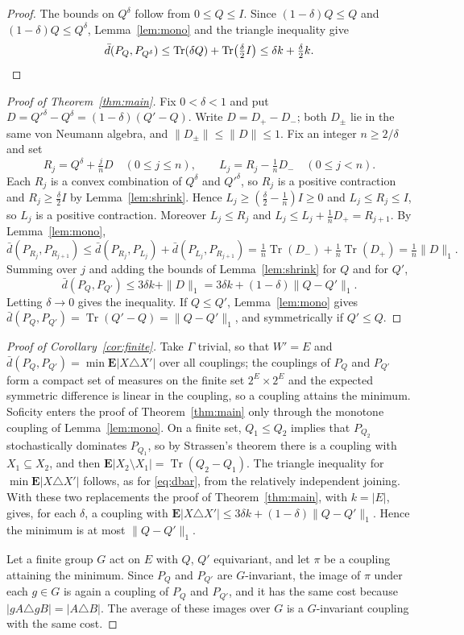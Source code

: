 \documentclass[11pt]{amsart}
\theoremstyle{remark}
\numberwithin{equation}{section}
\newcommand{\Tr}{\operatorname{Tr}}
\newcommand{\dbar}{\bar d}
\begin{document}
\begin{proof}
The bounds on $Q^\delta$ follow from $0\le Q\le I$. Since $(1-\delta)Q\le Q$ and $(1-\delta)Q\le Q^\delta$, Lemma~\ref{lem:mono} and the triangle inequality give
\[
\dbar(P_Q,P_{Q^\delta})\le\Tr(\delta Q)+\Tr\bigl(\tfrac\delta2 I\bigr)\le\delta k+\tfrac\delta2 k. \qedhere
\]
\end{proof}

\begin{proof}[Proof of Theorem~\ref{thm:main}]
Fix $0<\delta<1$ and put $D=Q'^\delta-Q^\delta=(1-\delta)(Q'-Q)$. Write $D=D_+-D_-$; both $D_\pm$ lie in the same von Neumann algebra, and $\|D_\pm\|\le\|D\|\le1$. Fix an integer $n\ge2/\delta$ and set
\[
R_j=Q^\delta+\tfrac jn D\quad(0\le j\le n),\qquad L_j=R_j-\tfrac1n D_-\quad(0\le j<n).
\]
Each $R_j$ is a convex combination of $Q^\delta$ and $Q'^\delta$, so $R_j$ is a positive contraction and $R_j\ge\frac\delta2 I$ by Lemma~\ref{lem:shrink}. Hence $L_j\ge(\frac\delta2-\frac1n)I\ge0$ and $L_j\le R_j\le I$, so $L_j$ is a positive contraction. Moreover $L_j\le R_j$ and $L_j\le L_j+\frac1nD_+=R_{j+1}$. By Lemma~\ref{lem:mono},
\[
\dbar(P_{R_j},P_{R_{j+1}})\le\dbar(P_{R_j},P_{L_j})+\dbar(P_{L_j},P_{R_{j+1}})=\tfrac1n\Tr(D_-)+\tfrac1n\Tr(D_+)=\tfrac1n\|D\|_1 .
\]
Summing over $j$ and adding the bounds of Lemma~\ref{lem:shrink} for $Q$ and for $Q'$,
\[
\dbar(P_Q,P_{Q'})\le 3\delta k+\|D\|_1=3\delta k+(1-\delta)\|Q-Q'\|_1 .
\]
Letting $\delta\to0$ gives the inequality. If $Q\le Q'$, Lemma~\ref{lem:mono} gives $\dbar(P_Q,P_{Q'})=\Tr(Q'-Q)=\|Q-Q'\|_1$, and symmetrically if $Q'\le Q$.
\end{proof}

\begin{proof}[Proof of Corollary~\ref{cor:finite}]
Take $\Gamma$ trivial, so that $W'=E$ and $\dbar(P_Q,P_{Q'})=\min\mathbf E|X\triangle X'|$ over all couplings; the couplings of $P_Q$ and $P_{Q'}$ form a compact set of measures on the finite set $2^E\times2^E$ and the expected symmetric difference is linear in the coupling, so a coupling attains the minimum. Soficity enters the proof of Theorem~\ref{thm:main} only through the monotone coupling of Lemma~\ref{lem:mono}. On a finite set, $Q_1\le Q_2$ implies that $P_{Q_2}$ stochastically dominates $P_{Q_1}$, so by Strassen's theorem \cite{St65} there is a coupling with $X_1\subseteq X_2$, and then $\mathbf E|X_2\setminus X_1|=\Tr(Q_2-Q_1)$. The triangle inequality for $\min\mathbf E|X\triangle X'|$ follows, as for \eqref{eq:dbar}, from the relatively independent joining. With these two replacements the proof of Theorem~\ref{thm:main}, with $k=|E|$, gives, for each $\delta$, a coupling with $\mathbf E|X\triangle X'|\le3\delta k+(1-\delta)\|Q-Q'\|_1$. Hence the minimum is at most $\|Q-Q'\|_1$.

Let a finite group $G$ act on $E$ with $Q$, $Q'$ equivariant, and let $\pi$ be a coupling attaining the minimum. Since $P_Q$ and $P_{Q'}$ are $G$-invariant, the image of $\pi$ under each $g\in G$ is again a coupling of $P_Q$ and $P_{Q'}$, and it has the same cost because $|gA\triangle gB|=|A\triangle B|$. The average of these images over $G$ is a $G$-invariant coupling with the same cost.
\end{proof}
\end{document}
